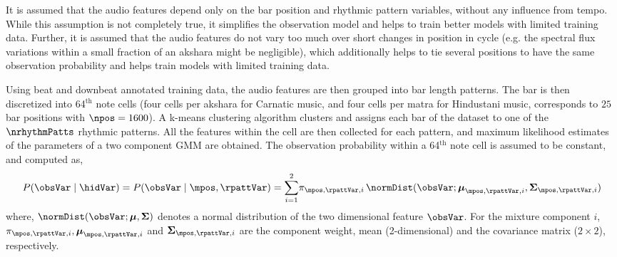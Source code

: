 It is assumed that the audio features depend only on the bar position and rhythmic pattern variables, without any influence from tempo. While this assumption is not completely true, it simplifies the observation model and helps to train better models with limited training data. Further, it is assumed that the audio features do not vary too much over short changes in position in cycle (e.g. the spectral flux variations within a small fraction of an \gls{akshara} might be negligible), which additionally helps to tie several positions to have the same observation probability and helps train models with limited training data.

Using beat and downbeat annotated training data, the audio features are then grouped into bar length patterns. The bar is then discretized into 64$^{\mathrm{th}}$ note cells (four cells per \gls{akshara} for Carnatic music, and four cells per \gls{matra} for Hindustani music, corresponds to $25$ bar positions with $\npos = 1600$). A k-means clustering algorithm clusters and assigns each bar of the dataset to one of the $\nrhythmPatts$ rhythmic patterns. All the features within the cell are then collected for each pattern, and maximum likelihood estimates of the parameters of a two component \gls{GMM} are obtained. The observation probability within a 64$^{\mathrm{th}}$ note cell is assumed to be constant, and computed as, 
\begin{equation}\label{eqn:bpm:obsmodel}
P(\obsVar \mid \hidVar) = P(\obsVar \mid \mpos,\rpattVar) = \overset{2}{\underset{i=1}{\sum}}\pi_{\mpos,\rpattVar,i}\,\normDist(\obsVar;\boldsymbol{\mu}_{\mpos,\rpattVar,i},\boldsymbol{\Sigma}_{\mpos,\rpattVar,i})
\end{equation}
where, $\normDist(\obsVar;\boldsymbol{\mu},\boldsymbol{\Sigma})$ denotes a normal distribution of the two dimensional feature $\obsVar$. For the mixture component $i$, $\pi_{\mpos,\rpattVar,i}, \boldsymbol{\mu}_{\mpos,\rpattVar,i}$ and $\boldsymbol{\Sigma}_{\mpos,\rpattVar,i}$ are the component weight, mean (2-dimensional) and the covariance matrix ($2\times2$), respectively.
% 
